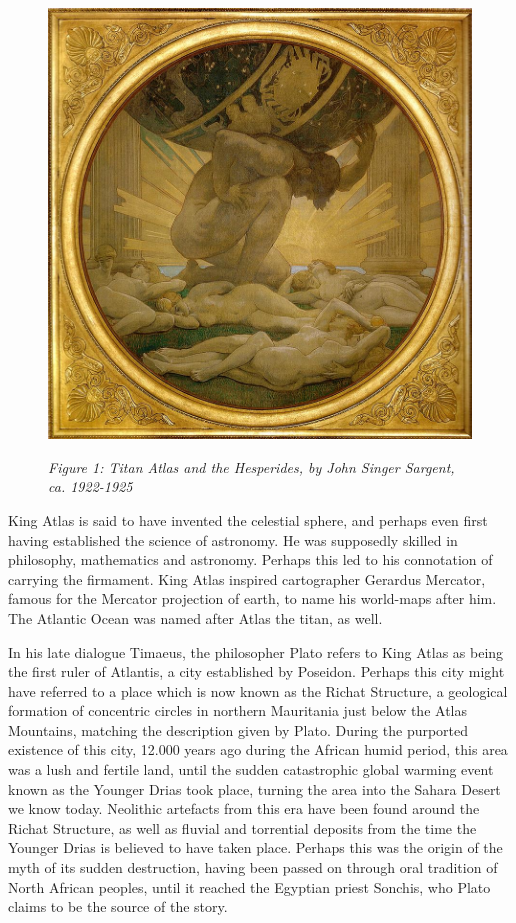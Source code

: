 \begin{figure}
\includegraphics[scale=0.1]{./Images/Atlas.jpeg}
 

\textit{Figure 1: Titan Atlas and the Hesperides, by John Singer Sargent, ca. 1922-1925}
\end{figure}

King Atlas is said to have invented the celestial sphere, and perhaps even first having established the science of astronomy. He was supposedly skilled in philosophy, mathematics and astronomy. Perhaps this led to his connotation of carrying the firmament. King Atlas inspired cartographer Gerardus Mercator, famous for the Mercator projection of earth, to name his world-maps after him. The Atlantic Ocean was named after Atlas the titan, as well.  

In his late dialogue Timaeus, the philosopher Plato refers to King Atlas as being the first ruler of Atlantis, a city established by Poseidon. Perhaps this city might have referred to a place which is now known as the Richat Structure, a geological formation of concentric circles in northern Mauritania just below the Atlas Mountains, matching the description given by Plato. During the purported existence of this city, 12.000 years ago during the African humid period, this area was a lush and fertile land, until the sudden catastrophic global warming event known as the Younger Drias took place, turning the area into the Sahara Desert we know today. Neolithic artefacts from this era have been found around the Richat Structure, as well as fluvial and torrential deposits from the time the Younger Drias is believed to have taken place. Perhaps this was the origin of the myth of its sudden destruction, having been passed on through oral tradition of North African peoples, until it reached the Egyptian priest Sonchis, who Plato claims to be the source of the story. 

